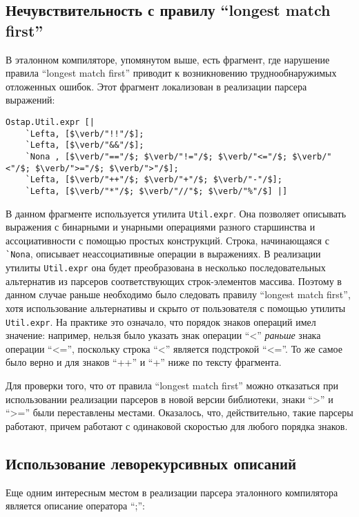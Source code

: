 \documentclass[conference]{IEEEtran}
\begin{document}
\subsection{Нечувствительность с правилу ``longest match first''}

В эталонном компиляторе, упомянутом выше, есть фрагмент, где нарушение правила ``longest match first'' приводит к возникновению труднообнаружимых отложенных ошибок.
Этот фрагмент локализован в реализации парсера выражений:

\begin{lstlisting}[basicstyle=\small]
  Ostap.Util.expr [|
    `Lefta, [$\verb/"!!"/$];
    `Lefta, [$\verb/"&&"/$];
    `Nona , [$\verb/"=="/$; $\verb/"!="/$; $\verb/"<="/$; $\verb/"<"/$; $\verb/">="/$; $\verb/">"/$];
    `Lefta, [$\verb/"++"/$; $\verb/"+"/$; $\verb/"-"/$];
    `Lefta, [$\verb/"*"/$; $\verb/"//"$; $\verb/"%"/$] |]
\end{lstlisting}

В данном фрагменте используется утилита \lstinline|Util.expr|. Она позволяет описывать выражения
с бинарными и унарными операциями разного старшинства и ассоциативности с помощью простых конструкций. Строка, начинающаяся с \lstinline|`Nona|, описывает неассоциативные
операции в выражениях. В реализации утилиты \lstinline|Util.expr| она будет преобразована в несколько последовательных альтернатив из парсеров соответствующих
строк-элементов массива. Поэтому в данном случае раньше необходимо было следовать правилу ``longest match first'', хотя использование альтернативы и скрыто от пользователя
с помощью утилиты \lstinline|Util.expr|. На практике это означало, что порядок знаков операций имел значение: например, нельзя было указать знак операции ``<'' \emph{раньше}
знака операции ``<='', поскольку строка ``<'' является подстрокой ``<=''. То же самое было верно и для знаков ``++'' и ``+'' ниже по тексту фрагмента.

Для проверки того, что от правила ``longest match first'' можно отказаться при использовании реализации парсеров в новой версии библиотеки, знаки ``>'' и ``>='' были
переставлены местами. Оказалось, что, действительно, такие парсеры работают, причем работают с одинаковой скоростью для любого порядка знаков.

\subsection{Использование леворекурсивных описаний}

Еще одним интересным местом в реализации парсера эталонного компилятора является описание оператора ``;'':
\end{document}
